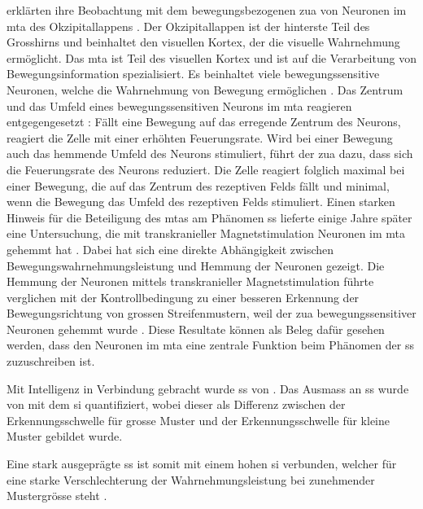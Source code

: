 \documentclass[11pt, twoside, a4paper]{book}		%
\begin{document}
\citet{Tadin2003} erklärten ihre Beobachtung mit dem bewegungsbezogenen \gls{zua} von Neuronen im \gls{mta} des Okzipitallappens \citep{Allman1985a}. 
Der Okzipitallappen ist der hinterste Teil des Grosshirns und beinhaltet den visuellen Kortex, der die visuelle Wahrnehmung ermöglicht. 
Das \gls{mta} ist Teil des visuellen Kortex und ist auf die Verarbeitung von Bewegungsinformation spezialisiert. Es beinhaltet viele bewegungssensitive Neuronen, welche die Wahrnehmung von Bewegung ermöglichen \citep{Goldstein2015}.
Das Zentrum und das Umfeld eines bewegungssensitiven Neurons im \gls{mta} reagieren entgegengesetzt \citep{Allman1985a}: Fällt eine Bewegung auf das erregende Zentrum des Neurons, reagiert die Zelle mit einer erhöhten Feuerungsrate. Wird bei einer Bewegung auch das hemmende Umfeld des Neurons stimuliert, führt der \gls{zua} dazu, dass sich die Feuerungsrate des Neurons reduziert. Die Zelle reagiert folglich maximal bei einer Bewegung, die auf das Zentrum des rezeptiven Felds fällt und minimal, wenn die Bewegung das Umfeld des rezeptiven Felds stimuliert. Einen starken Hinweis für die Beteiligung des \gls{mta}s am Phänomen \gls{ss} lieferte einige Jahre später eine Untersuchung, die mit transkranieller Magnetstimulation Neuronen im \gls{mta} gehemmt hat \citep{Tadin2011}. Dabei hat sich eine direkte Abhängigkeit zwischen Bewegungswahrnehmungsleistung und Hemmung der Neuronen gezeigt. Die Hemmung der Neuronen mittels transkranieller Magnetstimulation führte verglichen mit der Kontrollbedingung zu einer besseren Erkennung der Bewegungsrichtung von grossen Streifenmustern,  weil der \gls{zua} bewegungssensitiver Neuronen gehemmt wurde \citep{Tadin2011}. Diese Resultate können als Beleg dafür gesehen werden, dass den Neuronen im \gls{mta} eine zentrale Funktion beim Phänomen der \gls{ss} zuzuschreiben ist.

Mit Intelligenz in Verbindung gebracht wurde \gls{ss} von \citet{Melnick2013}.
Das Ausmass an \gls{ss} wurde von \citeauthor{Melnick2013} mit dem \gls{si} quantifiziert, wobei dieser als Differenz zwischen der Erkennungsschwelle für grosse Muster und der Erkennungsschwelle für kleine Muster gebildet wurde. 

Eine stark ausgeprägte \gls{ss} ist somit mit einem hohen \gls{si} verbunden, welcher für eine starke Verschlechterung der Wahrnehmungsleistung bei zunehmender Mustergrösse steht \citep{Melnick2013}.

\end{document}
